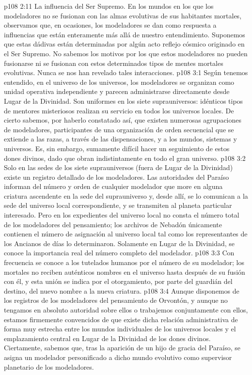 \vs p108 2:11 La influencia del Ser Supremo. En los mundos en los que los modeladores no se fusionan con las almas evolutivas de sus habitantes mortales, observamos que, en ocasiones, los modeladores se dan como respuesta a influencias que están enteramente más allá de nuestro entendimiento. Suponemos que estas dádivas están determinadas por algún acto reflejo cósmico originado en el Ser Supremo. No sabemos los motivos por los que estos modeladores no pueden fusionarse ni se fusionan con estos determinados tipos de mentes mortales evolutivas. Nunca se nos han revelado tales interacciones.
\vs p108 3:1 Según tenemos entendido, en el universo de los universos, los modeladores se organizan como unidad operativa independiente y parecen administrarse directamente desde Lugar de la Divinidad. Son uniformes en los siete suprauniversos: idénticos tipos de mentores misteriosos realizan su servicio en todos los universos locales. De cierto sabemos, por haberlo constatado así, que existen numerosas agrupaciones de modeladores, participantes de una organización de orden secuencial que se extiende a las razas, a través de las dispensaciones, y a los mundos, sistemas y universos. Es, sin embargo, sumamente difícil hacer un seguimiento de estos dones divinos, dado que obran indistintamente en todo el gran universo.
\vs p108 3:2 Solo en las sedes de los siete suprauniversos (fuera de Lugar de la Divinidad) existe un registro detallado de los modeladores. Las autoridades del Paraíso informan del número y orden de cualquier modelador que more en alguna criatura ascendente en la sede del suprauniverso y, desde allí, se lo comunican a la sede del universo local correspondiente, y se transmiten al planeta particular interesado. Pero en los expedientes del universo local no consta el número total de los modeladores del pensamiento; los archivos de Nebadón únicamente contienen el número de asignación al universo local tal como los representantes de los Ancianos de días lo determinaron. Solamente en Lugar de la Divinidad, se conoce la importancia real del número completo del modelador.
\vs p108 3:3 Con frecuencia se conoce a los tutelados humanos por el número de su modelador; los mortales no reciben auténticos nombres en el universo hasta después de su fusión con él, y esta unión se indica por el otorgamiento, por parte del guardián del destino, del nuevo nombre a la nueva criatura.
\vs p108 3:4 Aunque disponemos de los registros de los modeladores del pensamiento de Orvontón, y aunque no tengamos en absoluto autoridad sobre ellos o trabajemos conjuntamente con ellos, estamos firmemente convencidos de que existe dicha relación administrativa de forma muy estrecha entre los mundos individuales de los universos locales y el emplazamiento central en Lugar de la Divinidad de los dones divinos. Ciertamente, sabemos que, tras la aparición de un hijo de gracia del Paraíso, se asigna un modelador personificado a dicho mundo evolutivo como supervisor planetario de los modeladores.
